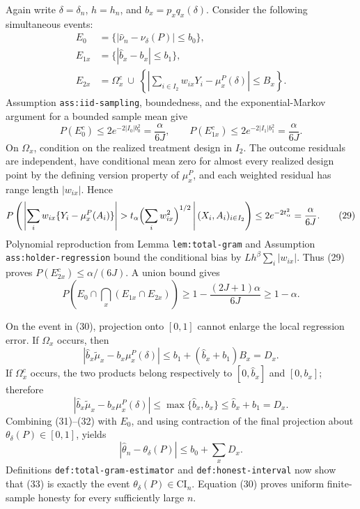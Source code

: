 Again write \(\delta=\delta_n\), \(h=h_n\), and \(b_x=p_xq_x(\delta)\).  Consider the following simultaneous events:
\[
 \begin{split}
 E_0&=\{|\widehat\nu_n-\nu_\delta(P)|\leq b_0\},\\
 E_{1x}&=\{|\widehat b_x-b_x|\leq b_1\},\\
 E_{2x}&=\Omega_x^c\ \cup\ 
 \left\{\left|\sum_{i\in I_2}w_{ix}Y_i-\mu_x^P(\delta)\right|\leq B_x\right\}.
 \end{split} \tag{27}
\]
Assumption \texttt{ass:iid-sampling}, boundedness, and the exponential-Markov argument for a bounded sample mean give
\[
 P(E_0^c)\leq2e^{-2|I_0|b_0^2}=\frac{\alpha}{6J},
 \qquad
 P(E_{1x}^c)\leq2e^{-2|I_1|b_1^2}=\frac{\alpha}{6J}. \tag{28}
\]
On \(\Omega_x\), condition on the realized treatment design in \(I_2\).  The outcome residuals are independent, have conditional mean zero for almost every realized design point by the defining version property of \(\mu_x^P\), and each weighted residual has range length \(|w_{ix}|\).  Hence
\[
 P\left(\left.\left|\sum_iw_{ix}\{Y_i-\mu_x^P(A_i)\}\right|>
 t_\alpha\Bigl(\sum_iw_{ix}^2\Bigr)^{1/2}\,\right|(X_i,A_i)_{i\in I_2}\right)
 \leq2e^{-2t_\alpha^2}=\frac{\alpha}{6J}. \tag{29}
\]
Polynomial reproduction from Lemma \texttt{lem:total-gram} and Assumption \texttt{ass:holder-regression} bound the conditional bias by \(Lh^\beta\sum_i|w_{ix}|\).  Thus (29) proves \(P(E_{2x}^c)\leq\alpha/(6J)\).  A union bound gives
\[
 P\left(E_0\cap\bigcap_x(E_{1x}\cap E_{2x})\right)
 \geq1-\frac{(2J+1)\alpha}{6J}\geq1-\alpha. \tag{30}
\]

On the event in (30), projection onto \([0,1]\) cannot enlarge the local regression error.  If \(\Omega_x\) occurs, then
\[
 |\widehat b_x\widetilde\mu_x-b_x\mu_x^P(\delta)|
 \leq b_1+(\widehat b_x+b_1)B_x=D_x. \tag{31}
\]
If \(\Omega_x^c\) occurs, the two products belong respectively to \([0,\widehat b_x]\) and \([0,b_x]\); therefore
\[
 |\widehat b_x\widetilde\mu_x-b_x\mu_x^P(\delta)|
 \leq\max\{\widehat b_x,b_x\}
 \leq\widehat b_x+b_1=D_x. \tag{32}
\]
Combining (31)--(32) with \(E_0\), and using contraction of the final projection about \(\theta_\delta(P)\in[0,1]\), yields
\[
 |\widehat\theta_n-\theta_\delta(P)|\leq b_0+\sum_xD_x. \tag{33}
\]
Definitions \texttt{def:total-gram-estimator} and \texttt{def:honest-interval} now show that (33) is exactly the event \(\theta_\delta(P)\in\mathrm{CI}_n\).  Equation (30) proves uniform finite-sample honesty for every sufficiently large \(n\).


